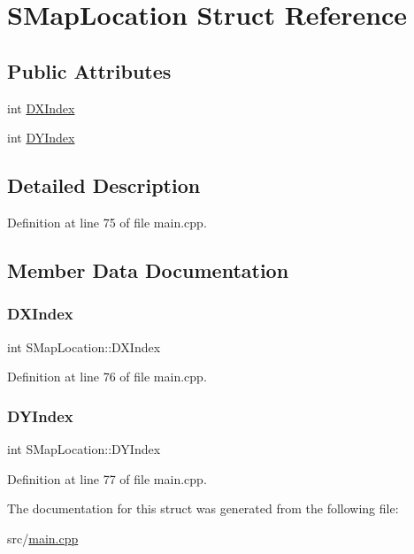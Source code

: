 \hypertarget{structSMapLocation}{}\section{S\+Map\+Location Struct Reference}
\label{structSMapLocation}
\subsection*{Public Attributes}
\begin{DoxyCompactItemize}
\item 
int \hyperlink{structSMapLocation_a4e54e22bebd7f1c262f8b412da4d755d}{D\+X\+Index}
\item 
int \hyperlink{structSMapLocation_a8897c7c5ddbcf79077daaf0fdfefb028}{D\+Y\+Index}
\end{DoxyCompactItemize}


\subsection{Detailed Description}


Definition at line 75 of file main.\+cpp.



\subsection{Member Data Documentation}
\hypertarget{structSMapLocation_a4e54e22bebd7f1c262f8b412da4d755d}{}\label{structSMapLocation_a4e54e22bebd7f1c262f8b412da4d755d} 
\subsubsection{\texorpdfstring{D\+X\+Index}{DXIndex}}
{\footnotesize\ttfamily int S\+Map\+Location\+::\+D\+X\+Index}



Definition at line 76 of file main.\+cpp.

\hypertarget{structSMapLocation_a8897c7c5ddbcf79077daaf0fdfefb028}{}\label{structSMapLocation_a8897c7c5ddbcf79077daaf0fdfefb028} 
\subsubsection{\texorpdfstring{D\+Y\+Index}{DYIndex}}
{\footnotesize\ttfamily int S\+Map\+Location\+::\+D\+Y\+Index}



Definition at line 77 of file main.\+cpp.



The documentation for this struct was generated from the following file\+:\begin{DoxyCompactItemize}
\item 
src/\hyperlink{main_8cpp}{main.\+cpp}\end{DoxyCompactItemize}
